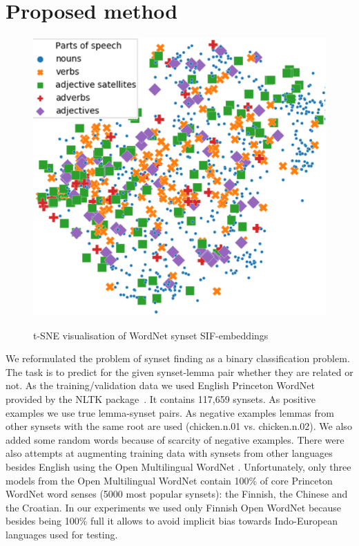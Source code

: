 \documentclass[conference]{IEEEtran}
\begin{document}
	\section{Proposed method}
	\begin{figure}
		
		\centering
		\small
		\includegraphics[scale=0.5]{wordnet-pos3}\\
		
		\caption{t-SNE visualisation of WordNet synset SIF-embeddings}
		\label{wordnet-pos}
	\end{figure}
	We reformulated the problem of synset finding as a binary classification problem. The task is to predict for the given synset-lemma pair whether they are related or not. As the training/validation data we used English Princeton WordNet \cite{wordnet} provided by the NLTK package~\cite{nltk}. It contains 117,659 synsets. As positive examples we use true lemma-synset pairs. As negative examples lemmas from other synsets with the same root are used (chicken.n.01 vs. chicken.n.02). We also added some random words because of scarcity of negative examples. There were also attempts at augmenting training data with synsets from other languages besides English using the Open Multilingual WordNet \cite{Bond2012, bond-wordnet}. Unfortunately, only three models from the Open Multilingual WordNet contain 100\% of core Princeton WordNet word senses (5000 most popular synsets): the Finnish, the Chinese and the Croatian. In our experiments we used only Finnish Open WordNet because besides being 100\% full it allows to avoid implicit bias towards Indo-European languages used for testing.
	
\end{document}

